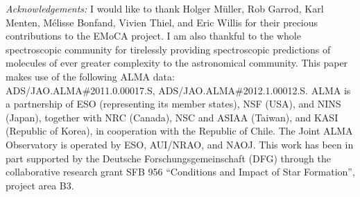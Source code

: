 \documentclass{iau}
\begin{document}
\vspace*{2ex}
\noindent\textit{Acknowledgements:} I would like to thank Holger M\"uller, Rob 
Garrod, Karl Menten, M\'elisse Bonfand, Vivien Thiel, and Eric Willis for 
their precious contributions to the EMoCA project. I am also thankful to the 
whole spectroscopic community for tirelessly providing spectroscopic
predictions of molecules of ever greater complexity to the astronomical
community. This paper makes use of the following ALMA data:\\
ADS/JAO.ALMA\#2011.0.00017.S, ADS/JAO.ALMA\#2012.1.00012.S. 
ALMA is a partnership of ESO (representing its member states), NSF (USA), and 
NINS (Japan), together with NRC (Canada), NSC and ASIAA (Taiwan), and KASI 
(Republic of Korea), in cooperation with the Republic of Chile. The Joint ALMA 
Observatory is operated by ESO, AUI/NRAO, and NAOJ. 
This work has been in part supported by the Deutsche Forschungsgemeinschaft 
(DFG) through the collaborative research grant SFB 956 ``Conditions and Impact 
of Star Formation'', project area B3. 
\end{document}
